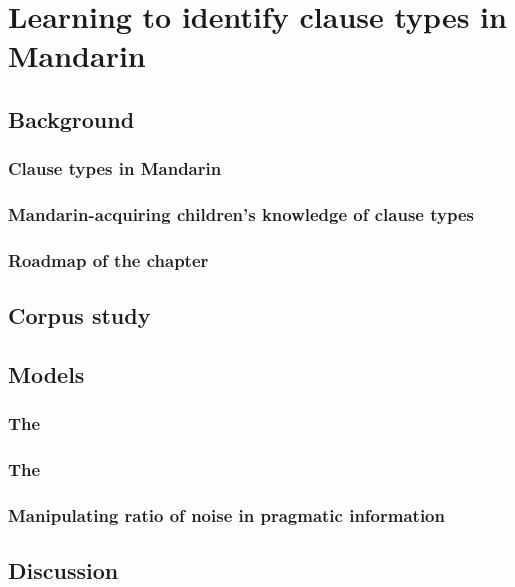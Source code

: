 \chapter{Learning to identify clause types in Mandarin}
\label{chap:man-cl}

\section{Background}
\subsection{Clause types in Mandarin}

\subsection{Mandarin-acquiring children's knowledge of clause types}

\subsection{Roadmap of the chapter}

\section{Corpus study}

\section{Models}
\subsection{The \distlearner{}}
\subsection{The \praglearner{}}
\subsection{Manipulating ratio of noise in pragmatic information}

\section{Discussion}





